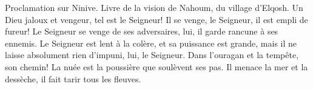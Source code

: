Proclamation sur Ninive. Livre de la vision de Nahoum, du village d’Elqosh.
Un Dieu jaloux et vengeur, tel est le Seigneur!
	Il se venge, le Seigneur, il est empli de fureur!
	Le Seigneur se venge de ses adversaires, lui, il garde rancune à ses ennemis.
Le Seigneur est lent à la colère, et sa puissance est grande,
	mais il ne laisse absolument rien d’impuni, lui, le Seigneur.
Dans l’ouragan et la tempête, son chemin!
	La nuée est la poussière que soulèvent ses pas.
Il menace la mer et la dessèche, il fait tarir tous les fleuves.

